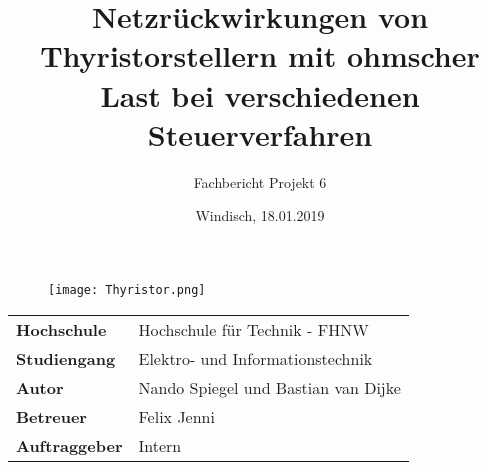 \documentclass[final]{fhnwreport}       %
\title{Netzrückwirkungen von Thyristorstellern mit ohmscher Last bei verschiedenen Steuerverfahren}          %
\author{Fachbericht Projekt 6}          %
\date{Windisch, 18.01.2019}             %
\begin{document}
\maketitle

\vspace*{-1cm}						    %
\vfill
\begin{figure}[H]
\centering
\texttt{[image: Thyristor.png]}
\end{figure}
\vfill

{
\renewcommand\arraystretch{2}
\begin{center}
\begin{tabular}{>{\bf}p{4cm} l}
Hochschule                 &    Hochschule für Technik - FHNW\\
Studiengang                &    Elektro- und Informationstechnik\\
Autor   		           & 	Nando Spiegel und Bastian van Dijke\\
Betreuer                   &    Felix Jenni\\
Auftraggeber               &    Intern\\
\end{tabular}
\end{center}
}

\clearpage
			
\thispagestyle{empty}



\tableofcontents
\clearpage











{\sloppypar
\printbibliography[heading=bibintoc]
\label{sec:lit}
}
\listoffigures
\listoftables


\ifdraft{%
\newpage
\clearpage
}
{%
}
\end{document}
